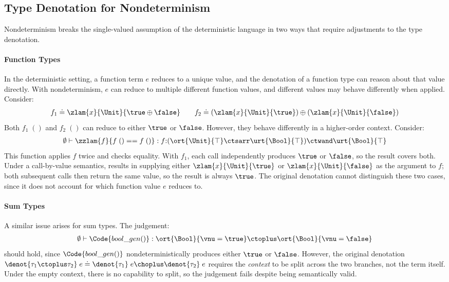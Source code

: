 \subsection{Type Denotation for Nondeterminism}\label{subsec:nondet-denotation}

Nondeterminism breaks the single-valued assumption of the deterministic
language in two ways that require adjustments to the type denotation.

\paragraph{Function Types}
In the deterministic setting, a function term $e$ reduces to a unique
value, and the denotation of a function type can reason about that
value directly.  With nondeterminism, $e$ can reduce to multiple
different function values, and different values may behave differently
when applied.  Consider:
\begin{align*}
  f_1 \doteq \zlam{x}{\Unit}{\true \oplus \false}
  \qquad
  f_2 \doteq (\zlam{x}{\Unit}{\true}) \oplus (\zlam{x}{\Unit}{\false})
\end{align*}
Both $f_1\;()$ and $f_2\;()$ can reduce to either $\true$ or $\false$.
However, they behave differently in a higher-order context.  Consider:
\begin{align*}
  \emptyset \vdash \zzlam{f}{f\;() == f\;()} :
  f{:}(\ort{\Unit}{\top} \ctsarr \urt{\Bool}{\top}) \ctwand
  \urt{\Bool}{\top}
\end{align*}
This function applies $f$ twice and checks equality.  With $f_1$,
each call independently produces $\true$ or $\false$, so the result
covers both.  Under a call-by-value semantics, results in supplying either
$\zlam{x}{\Unit}{\true}$ or $\zlam{x}{\Unit}{\false}$
as the argument to $f$; both subsequent calls then return the same
value, so the result is always $\true$.  The original denotation
cannot distinguish these two cases, since it does not account for
which function value $e$ reduces to.

\paragraph{Sum Types}
A similar issue arises for sum types.  The judgement:
\begin{align*}
  \emptyset \vdash \Code{bool\_gen()} :
  \ort{\Bool}{\vnu = \true} \ctoplus \ort{\Bool}{\vnu = \false}
\end{align*}
should hold, since $\Code{bool\_gen()}$ nondeterministically produces
either $\true$ or $\false$.  However, the original denotation
$\denot{\tau_1 \ctoplus \tau_2}\;e \doteq \denot{\tau_1}\;e \choplus
\denot{\tau_2}\;e$ requires the \emph{context} to be split across the
two branches, not the term itself.  Under the empty context, there is
no capability to split, so the judgement fails despite being
semantically valid.

